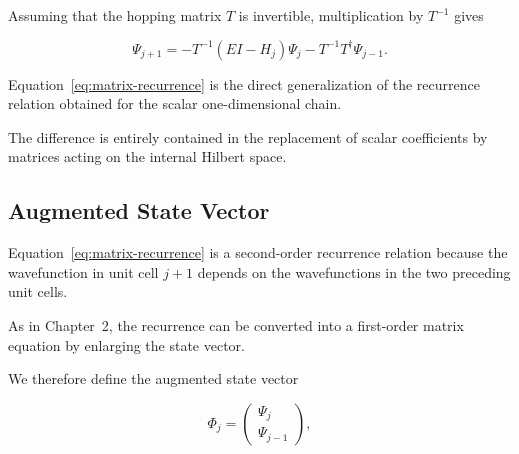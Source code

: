 Assuming that the hopping matrix $T$ is invertible, multiplication by
$T^{-1}$ gives

\begin{equation}
	\Psi_{j+1}
	=
	-
	T^{-1}(EI-H_j)\Psi_j
	-
	T^{-1}T^\dagger\Psi_{j-1}.
	\label{eq:matrix-recurrence}
\end{equation}

Equation~\eqref{eq:matrix-recurrence} is the direct generalization of
the recurrence relation obtained for the scalar one-dimensional chain.

The difference is entirely contained in the replacement of scalar
coefficients by matrices acting on the internal Hilbert space.


\begin{center}
\end{center}


\subsection{Augmented State Vector}

Equation~\eqref{eq:matrix-recurrence} is a second-order recurrence
relation because the wavefunction in unit cell $j+1$ depends on the
wavefunctions in the two preceding unit cells.

As in Chapter~2, the recurrence can be converted into a first-order
matrix equation by enlarging the state vector.

We therefore define the augmented state vector

\begin{equation}
	\Phi_j
	=
	\begin{pmatrix}
		\Psi_j \\
		\Psi_{j-1}
	\end{pmatrix},
	\label{eq:augmented-state}
\end{equation}

